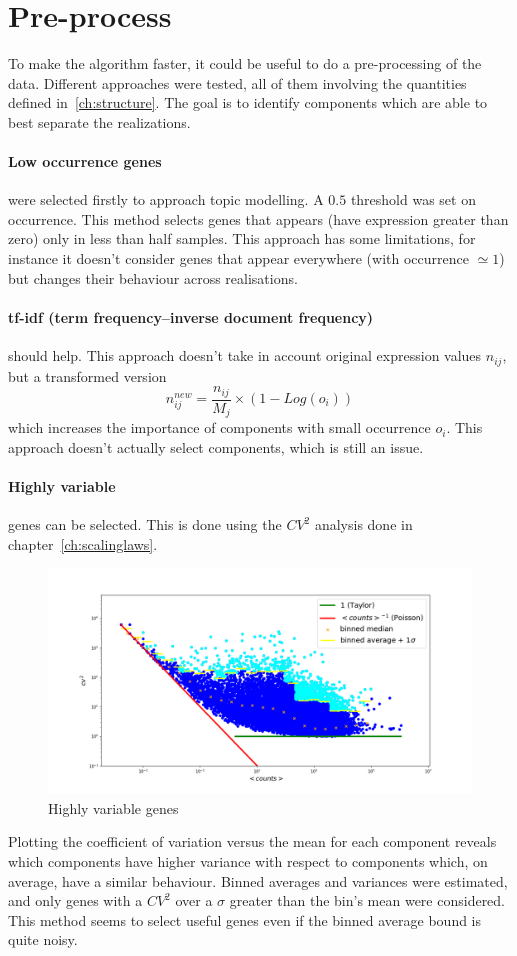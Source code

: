 \section{Pre-process}
To make the algorithm faster, it could be useful to do a pre-processing of the data.
Different approaches were tested, all of them involving the quantities defined in~\ref{ch:structure}. The goal is to identify components which are able to best separate the realizations. 
\paragraph{Low occurrence genes} were selected firstly to approach topic modelling. A $0.5$ threshold was set on occurrence. This method selects genes that appears (have expression greater than zero) only in less than half samples. This approach has some limitations, for instance it doesn't consider genes that appear everywhere (with occurrence $\simeq 1$) but changes their behaviour across realisations.

\paragraph{tf-idf (term frequency–inverse document frequency)} should help. This approach doesn't take in account original expression values $n_{ij}$, but a transformed version
\[
n^{new}_{ij}=\frac{n_{i j}}{M_j}\times \left(1-Log\left(o_i\right)\right)
\] which increases the importance of components with small occurrence $o_i$. This approach doesn't actually select components, which is still an issue.

\paragraph{Highly variable} genes can be selected. This is done using the $CV^2$ analysis done in chapter~\ref{ch:scalinglaws}.
\begin{figure}[htb!]
    \centering
    \includegraphics[width=0.8\linewidth]{pictures/topic/cvmean_oversigma.png}
    \caption{Highly variable genes}
    \label{fig:topic/cvmean_oversigma}
\end{figure}
Plotting the coefficient of variation versus the mean for each component reveals which components have higher variance with respect to components which, on average, have a similar behaviour. Binned averages and variances were estimated, and only genes with a $CV^2$ over a $\sigma$ greater than the bin's mean were considered. This method seems to select useful genes even if the binned average bound is quite noisy.

